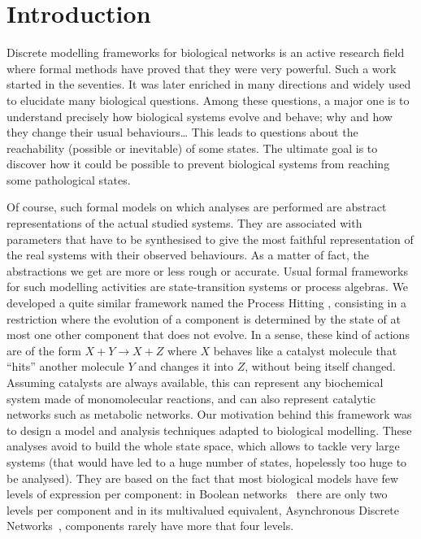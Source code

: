\section{Introduction}
\label{sec:intro}


Discrete modelling frameworks for biological networks is an active research field where formal methods have proved that they were very powerful.
Such a work started in the seventies.
It was later enriched in many directions and widely used to elucidate many biological questions.
Among these questions, a major one is to understand precisely how biological systems evolve and behave; why and how they change their usual behaviours…
This leads to questions about the reachability (possible or inevitable) of some states.
The ultimate goal is to discover how it could be possible to prevent biological systems from reaching some pathological states.

Of course, such formal models on which analyses are performed are abstract representations of the actual studied systems.
They are associated with parameters that have to be synthesised %
to give the most faithful representation of the real systems with their observed behaviours.
As a matter of fact, the abstractions we get are more or less rough or accurate.
Usual formal frameworks for such modelling activities are state-transition systems or process algebras. %
We developed a quite similar framework named the Process Hitting \cite{PMR10-TCSB},
consisting in a restriction where the evolution of a component is determined by the state of at most one other component that does not evolve.
In a sense, these kind of actions are of the form $X + Y \rightarrow X + Z$ where $X$ behaves like a catalyst molecule that “hits” another molecule $Y$ and changes it into $Z$, without being itself changed.
Assuming catalysts are always available, this can represent any biochemical system made of monomolecular reactions, and can also represent catalytic networks such as metabolic networks.
Our motivation behind this framework was to design a model and analysis techniques adapted to biological modelling.
These analyses avoid to build the whole state space, which allows to tackle very large systems (that would have led to a huge number of states, hopelessly too huge to be analysed).
They are based on the fact that most biological models have few levels of expression per component:
in Boolean networks~\cite{kauffman69,Thomas73} there are only two levels per component and in its multivalued equivalent, Asynchronous Discrete Networks~\cite{deJong02}, components rarely have more that four levels.

